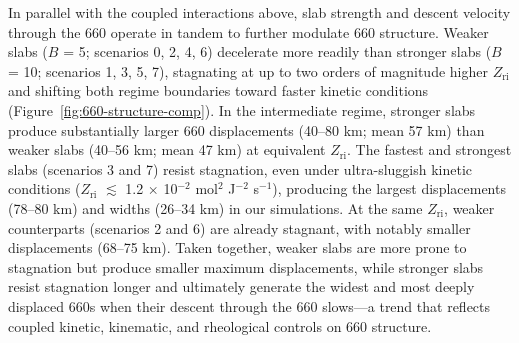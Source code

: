 \documentclass[draft,linenumbers]{agujournal2019}
\begin{document}
In parallel with the coupled interactions above, slab strength and
descent velocity through the 660 operate in tandem to further modulate
660 structure. Weaker slabs (\(B\) = 5; scenarios 0, 2, 4, 6) decelerate
more readily than stronger slabs (\(B\) = 10; scenarios 1, 3, 5, 7),
stagnating at up to two orders of magnitude higher \(Z_\mathrm{ri}\) and
shifting both regime boundaries toward faster kinetic conditions
(Figure~\ref{fig:660-structure-comp}). In the intermediate regime,
stronger slabs produce substantially larger 660 displacements (40--80
km; mean 57 km) than weaker slabs (40--56 km; mean 47 km) at equivalent
\(Z_\mathrm{ri}\). The fastest and strongest slabs (scenarios 3 and 7)
resist stagnation, even under ultra-sluggish kinetic conditions
(\(Z_\mathrm{ri}\) \(\lesssim\) 1.2 \(\times\) 10\(^{-2}\) mol\(^2\)
J\(^{-2}\) s\(^{-1}\)), producing the largest displacements (78--80 km)
and widths (26--34 km) in our simulations. At the same
\(Z_\mathrm{ri}\), weaker counterparts (scenarios 2 and 6) are already
stagnant, with notably smaller displacements (68--75 km). Taken
together, weaker slabs are more prone to stagnation but produce smaller
maximum displacements, while stronger slabs resist stagnation longer and
ultimately generate the widest and most deeply displaced 660s when their
descent through the 660 slows---a trend that reflects coupled kinetic,
kinematic, and rheological controls on 660 structure.
\end{document}
